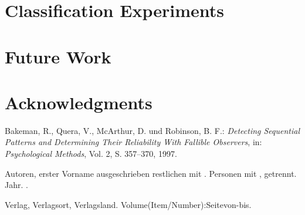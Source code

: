 \documentclass[11pt,a4paper]{article}
\begin{document}
\section{Classification Experiments}
 \label{sec:Classification Experiments}




\section{Future Work}
 \label{sec:Future Work}


\section*{Acknowledgments}

%
%

\begin{thebibliography}{}

Bakeman, R., Quera, V., McArthur, D. und Robinson, B. F.: {\em Detecting Sequential Patterns and Determining Their Reliability With Fallible Observers}, in: {\em Psychological Methods}, Vol. 2, S. 357--370, 1997. 



{Autoren, erster Vorname ausgeschrieben restlichen mit . Personen mit , getrennt}.
\newblock Jahr.
.
\begin{comment}
italic text:
Titel nur bei Büchern,
Artikel der Journal Name,
Workshop
Abschnitt in einem Buch nicht italic
\end{comment}
\newblock Verlag, Verlagsort, Verlagsland.
\newblock Volume(Item/Number):Seitevon-bis. 
\begin{comment}
	Volume durchlaufend 
	Number jahrbezogen
\end{comment}
\end{thebibliography}
\end{document}
